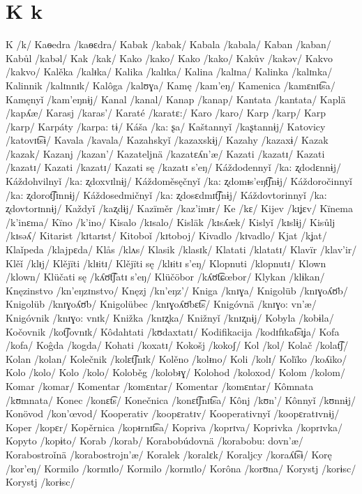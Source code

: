 \chapter{K k}

K /k/
Kaѳedra /kaѳɛdra/
Kabak /kabak/
Kabala /kabala/
Kaban /kaban/
Kabůl /kabəl/
Kak /kak/
Kako /kako/
Kako /kako/
Kakův /kakəv/
Kakvo /kakvo/
Kalěka /kalᵻka/
Kalika /kalɪka/
Kalina /kalɪna/
Kalinka /kalɪnka/
Kalinnik /kalɪnnɪk/
Kalôga /kalʊɣa/
Kamę /kam’eŋ/
Kamenica /kamɛnɪt͡sa/
Kamęnyǐ /kam’eŋnɨj/
Kanal /kanal/
Kanap /kanap/
Kantata /kantata/
Kaplä /kapʎæ/
Karasj /karas’/
Karaté /karatɛ:/
Karo /karo/
Karp /karp/
Karp /karp/
Karpáty /karpa: tɨ/
Káša /ka: ʂa/
Kaštannyǐ /kaʂtannɨj/
Katovicy /katovɪt͡sɨ/
Kavala /kavala/
Kazahskyǐ /kazaxskɨj/
Kazahy /kazaxɨ/
Kazak /kazak/
Kazanj /kazan’/
Kazateljnä /kazatɛʎn’æ/
Kazati /kazatɪ/
Kazati /kazatɪ/
Kazati /kazatɪ/
Kazati sę /kazatɪ s’eŋ/
Káždodennyǐ /ka: ʐdodɛnnɨj/
Káždohvilnyǐ /ka: ʐdoxvɪlnɨj/
Káždoměsęčnyǐ /ka: ʐdomᵻs’eŋt͡ʃnɨj/
Káždoročinnyǐ /ka: ʐdorot͡ʃɪnnɨj/
Káždosedmičnyǐ /ka: ʐdosɛdmɪt͡ʃnɨj/
Káždovtorinnyǐ /ka: ʐdovtorɪnnɨj/
Každyǐ /kaʐdɨj/
Kazïměr /kaz’imᵻr/
Ke /kɛ/
Kijev /kɪʝɛv/
Kïnema /k’inɛma/
Kïno /k’ino/
Kisalo /kɪsalo/
Kisläk /kɪsʎæk/
Kislyǐ /kɪslɨj/
Kisůlj /kɪsəʎ/
Kitarist /kɪtarɪst/
Kitoboǐ /kɪtoboj/
Kivadlo /kɪvadlo/
Kjat /kʝat/
Klaǐpeda /klajpɛda/
Klås /klʌs/
Klasik /klasɪk/
Klatati /klatatɪ/
Klavïr /klav’ir/
Klěǐ /klᵻj/
Klějïti /klᵻitɪ/
Klějïti sę /klᵻitɪ s’eŋ/
Klopnuti /klopnutɪ/
Klown /klown/
Klüčati sę /kʎʊ̈t͡ʃatɪ s’eŋ/
Klüčöbor /kʎʊ̈t͡ɕœbor/
Klykan /klɨkan/
Knęzinstvo /kn’eŋzɪnstvo/
Knęzj /kn’eŋz’/
Kniga /knɪɣa/
Knigolüb /knɪɣoʎʊ̈b/
Knigolüb /knɪɣoʎʊ̈b/
Knigolübec /knɪɣoʎʊ̈bɛt͡s/
Knigóvnä /knɪɣo: vn’æ/
Knigóvnik /knɪɣo: vnɪk/
Knižka /knɪʐka/
Knižnyǐ /knɪʐnɨj/
Kobyla /kobɨla/
Kočovnik /kot͡ʃovnɪk/
Kôdahtati /kʊdaxtatɪ/
Kodifikacija /kodɪfɪkat͡sɪʝa/
Kofa /kofa/
Koĝda /kogda/
Kohati /koxatɪ/
Kokošj /kokoʃ/
Kol /kol/
Kolač /kolat͡ʃ/
Kolan /kolan/
Kolečnik /kolɛt͡ʃnɪk/
Kolěno /kolᵻno/
Koli /kolɪ/
Kolïko /koʎiko/
Kolo /kolo/
Kolo /kolo/
Koloběg /kolobᵻɣ/
Kolohod /koloxod/
Kolom /kolom/
Komar /komar/
Komentar /komɛntar/
Komentar /komɛntar/
Kômnata /kʊmnata/
Konec /konɛt͡s/
Konečnica /konɛt͡ʃnɪt͡sa/
Kônj /kʊn’/
Kônnyǐ /kʊnnɨj/
Konövod /kon’œvod/
Kooperativ /koopɛratɪv/
Kooperativnyǐ /koopɛratɪvnɨj/
Koper /kopɛr/
Kopěrnica /kopᵻrnɪt͡sa/
Kopriva /koprɪva/
Koprivka /koprɪvka/
Kopyto /kopɨto/
Korab /korab/
Korabobúdovnä /korabobu: dovn’æ/
Korabostroǐnä /korabostrojn’æ/
Koralek /koralɛk/
Koraljcy /koraʎt͡sɨ/
Korę /kor’eŋ/
Kormilo /kormɪlo/
Kormilo /kormɪlo/
Korôna /korʊna/
Korystj /korɨsc/
Korystj /korɨsc/

